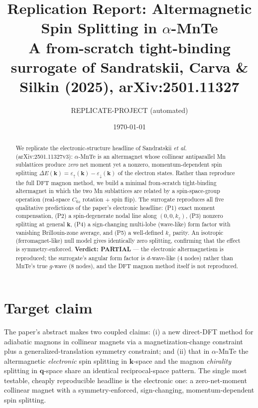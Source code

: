 \documentclass[aps,prb,twocolumn,superscriptaddress]{revtex4-2}
\begin{document}
\title{Replication Report: Altermagnetic Spin Splitting in $\alpha$-MnTe\\
\small A from-scratch tight-binding surrogate of Sandratskii, Carva \& Silkin (2025), arXiv:2501.11327}
\author{REPLICATE-PROJECT (automated)}
\date{\today}
\begin{abstract}
We replicate the electronic-structure headline of Sandratskii \textit{et al.}
(arXiv:2501.11327v3): $\alpha$-MnTe is an altermagnet whose collinear
antiparallel Mn sublattices produce \emph{zero} net moment yet a nonzero,
momentum-dependent spin splitting $\Delta E(\mathbf{k})=\varepsilon_\uparrow(\mathbf{k})-\varepsilon_\downarrow(\mathbf{k})$
of the electron states. Rather than reproduce the full DFT magnon method, we
build a minimal from-scratch tight-binding altermagnet in which the two Mn
sublattices are related by a spin-space-group operation (real-space $C_{6z}$
rotation $+$ spin flip). The surrogate reproduces all five qualitative
predictions of the paper's electronic headline: (P1) exact moment compensation,
(P2) a spin-degenerate nodal line along $(0,0,k_z)$, (P3) nonzero splitting at
general $\mathbf{k}$, (P4) a sign-changing multi-lobe (wave-like) form factor
with vanishing Brillouin-zone average, and (P5) a well-defined $k_z$ parity.
An isotropic (ferromagnet-like) null model gives identically zero splitting,
confirming that the effect is symmetry-enforced. \textbf{Verdict: PARTIAL} ---
the electronic altermagnetism is reproduced; the surrogate's angular form factor
is $d$-wave-like (4 nodes) rather than MnTe's true $g$-wave (8 nodes), and the
DFT magnon method itself is not reproduced.
\end{abstract}
\maketitle

\section{Target claim}
The paper's abstract makes two coupled claims: (i) a new direct-DFT method for
adiabatic magnons in collinear magnets via a magnetization-change constraint plus
a generalized-translation symmetry constraint; and (ii) that in $\alpha$-MnTe the
altermagnetic \emph{electronic} spin splitting in $\mathbf{k}$-space and the
magnon \emph{chirality} splitting in $\mathbf{q}$-space share an identical
reciprocal-space pattern. The single most testable, cheaply reproducible headline
is the electronic one: a zero-net-moment collinear magnet with a symmetry-enforced,
sign-changing, momentum-dependent spin splitting.
\end{document}
